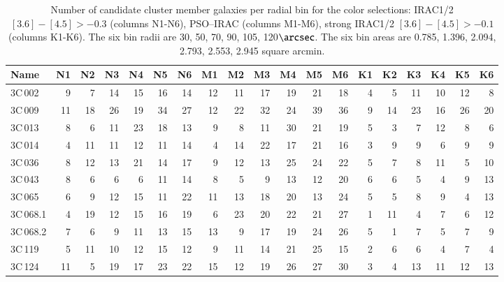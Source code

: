\documentclass[mathleft,fleqn,%
]{an}
\begin{document}
\begin{table*}
\renewcommand{\thetable}{\arabic{table}}
\centering
\footnotesize
\caption{Number of candidate cluster member galaxies per radial bin
  for the color selections: IRAC1/2 $[3.6] - [4.5] > -0.3$ (columns N1-N6),  
  PSO--IRAC (columns M1-M6), strong IRAC1/2 $[3.6] - [4.5] > -0.1$ (columns K1-K6). 
  The six bin radii are 30, 50, 70, 90, 105, 120$\arcsec$. The six bin
  areas are 0.785, 1.396, 2.094, 2.793, 2.553, 2.945  square arcmin.
} 
\label{table_radial_densities}
\begin{tabular}{l|rrrrrr|rrrrrr|rrrrrr}
\hline
Name       & N1   & N2 & N3 & N4 & N5 & N6 &  M1 & M2 & M3 & M4 & M5 & M6   & K1 & K2 & K3 & K4 & K5 & K6  \\
\hline 
     3C\,002 &    9 &     7 &   14 &  15 &  16 &  14  &   12 &  11 &  17 &  19 &  21 &  18  &    4 &   5 &  11 &  10 &  12 &   8 \\
     3C\,009 &   11 &    18 &   26 &  19 &  34 &  27  &   12 &  22 &  32 &  24 &  39 &  36  &    9 &  14 &  23 &  16 &  26 &  20 \\
     3C\,013 &    8 &     6 &   11 &  23 &  18 &  13  &    9 &   8 &  11 &  30 &  21 &  19  &    5 &   3 &   7 &  12 &   8 &   6 \\
     3C\,014 &    4 &    11 &   11 &  12 &  11 &  14  &    4 &  14 &  22 &  17 &  21 &  16  &    3 &   9 &   9 &   6 &   9 &   9 \\
     3C\,036 &    8 &    12 &   13 &  21 &  14 &  17  &    9 &  12 &  13 &  25 &  24 &  22  &    5 &   7 &   8 &  11 &   5 &  10 \\
     3C\,043 &    8 &     6 &    6 &   6 &  11 &  14  &    8 &   5 &   9 &  13 &  12 &  20  &    6 &   6 &   5 &   4 &   9 &  13 \\
     3C\,065 &    6 &     9 &   12 &  15 &  11 &  22  &   11 &  13 &  18 &  20 &  13 &  24  &    5 &   5 &   8 &   9 &   4 &  13 \\
   3C\,068.1 &    4 &    19 &   12 &  15 &  16 &  19  &    6 &  23 &  20 &  22 &  21 &  27  &    1 &  11 &   4 &   7 &   6 &  12 \\
   3C\,068.2 &    7 &     6 &    9 &  11 &  13 &  15  &   13 &   9 &  17 &  19 &  24 &  26  &    5 &   1 &   7 &   5 &   7 &   9 \\
     3C\,119 &    5 &    11 &   10 &  12 &  15 &  12  &    9 &  11 &  14 &  21 &  25 &  15  &    2 &   6 &   6 &   4 &   7 &   4 \\
     3C\,124 &   11 &     5 &   19 &  17 &  23 &  22  &   15 &  12 &  19 &  26 &  27 &  30  &    3 &   4 &  13 &  11 &  12 &  13 \\

\end{tabular}
\end{table*}
\end{document}
